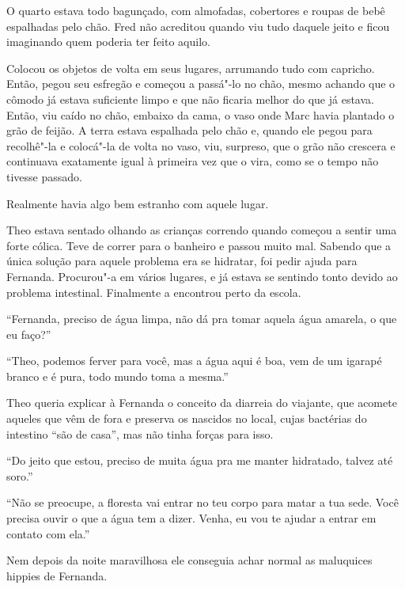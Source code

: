 \asterisc


O quarto estava todo bagunçado, com almofadas, cobertores e roupas de
bebê espalhadas pelo chão. Fred não acreditou quando viu tudo daquele
jeito e ficou imaginando quem poderia ter feito aquilo.

Colocou os objetos de volta em seus lugares, arrumando tudo com
capricho. Então, pegou seu esfregão e começou a passá"-lo no chão, mesmo
achando que o cômodo já estava suficiente limpo e que não ficaria melhor
do que já estava. Então, viu caído no chão, embaixo da cama, o vaso onde
Marc havia plantado o grão de feijão. A terra estava espalhada pelo chão
e, quando ele pegou para recolhê"-la e colocá"-la de volta no vaso, viu,
surpreso, que o grão não crescera e continuava exatamente igual à
primeira vez que o vira, como se o tempo não tivesse passado.

Realmente havia algo bem estranho com aquele lugar.

\asterisc


Theo estava sentado olhando as
crianças correndo quando começou a sentir uma forte cólica. Teve de
correr para o banheiro e passou muito mal. Sabendo que a única solução
para aquele problema era se hidratar, foi pedir ajuda para Fernanda.
Procurou"-a em vários lugares, e já estava se sentindo tonto devido ao
problema intestinal. Finalmente a encontrou perto da escola.

``Fernanda, preciso de água limpa, não dá pra tomar aquela água amarela,
o que eu faço?''

``Theo, podemos ferver para você, mas a água aqui é boa, vem de um
igarapé branco e é pura, todo mundo toma a mesma.''

Theo queria explicar à Fernanda o conceito da diarreia do viajante, que
acomete aqueles que vêm de fora e preserva os nascidos no local, cujas
bactérias do intestino ``são de casa'', mas não tinha forças para isso.

``Do jeito que estou, preciso de muita água pra me manter hidratado,
talvez até soro.''

``Não se preocupe, a floresta vai entrar no teu corpo para matar a tua
sede. Você precisa ouvir o que a água tem a dizer. Venha, eu vou te
ajudar a entrar em contato com ela.''

Nem depois da noite maravilhosa ele conseguia achar normal as maluquices
hippies de Fernanda.

